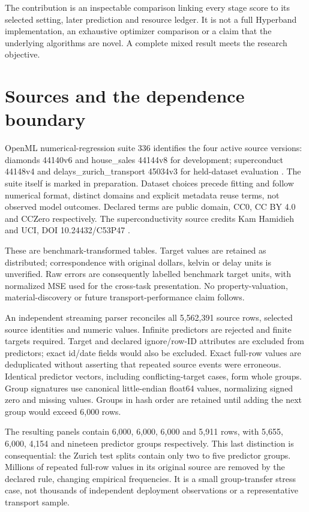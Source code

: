 \documentclass[11pt]{article}
\begin{document}
The contribution is an inspectable comparison linking every stage score to its selected setting, later prediction and resource ledger. It is not a full Hyperband implementation, an exhaustive optimizer comparison or a claim that the underlying algorithms are novel. A complete mixed result meets the research objective.
\section{Sources and the dependence boundary}
OpenML numerical-regression suite 336 identifies the four active source versions: diamonds 44140v6 and house\_sales 44144v8 for development; superconduct 44148v4 and delays\_zurich\_transport 45034v3 for held-dataset evaluation \cite{openml}. The suite itself is marked in preparation. Dataset choices precede fitting and follow numerical format, distinct domains and explicit metadata reuse terms, not observed model outcomes. Declared terms are public domain, CC0, CC BY 4.0 and CCZero respectively. The superconductivity source credits Kam Hamidieh and UCI, DOI 10.24432/C53P47 \cite{uci}.

These are benchmark-transformed tables. Target values are retained as distributed; correspondence with original dollars, kelvin or delay units is unverified. Raw errors are consequently labelled benchmark target units, with normalized MSE used for the cross-task presentation. No property-valuation, material-discovery or future transport-performance claim follows.

An independent streaming parser reconciles all 5,562,391 source rows, selected source identities and numeric values. Infinite predictors are rejected and finite targets required. Target and declared ignore/row-ID attributes are excluded from predictors; exact id/date fields would also be excluded. Exact full-row values are deduplicated without asserting that repeated source events were erroneous. Identical predictor vectors, including conflicting-target cases, form whole groups. Group signatures use canonical little-endian float64 values, normalizing signed zero and missing values. Groups in hash order are retained until adding the next group would exceed 6,000 rows.

The resulting panels contain 6,000, 6,000, 6,000 and 5,911 rows, with 5,655, 6,000, 4,154 and nineteen predictor groups respectively. This last distinction is consequential: the Zurich test splits contain only two to five predictor groups. Millions of repeated full-row values in its original source are removed by the declared rule, changing empirical frequencies. It is a small group-transfer stress case, not thousands of independent deployment observations or a representative transport sample.
\end{document}
